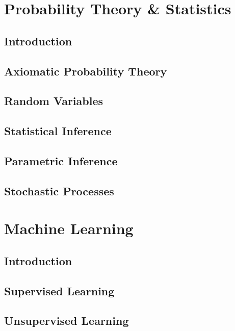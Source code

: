 \documentclass[a4paper, notitlepage]{report}
\begin{document}
\part{Probability Theory \& Statistics}

\chapter{Introduction}


\chapter{Axiomatic Probability Theory}


\chapter{Random Variables}


\chapter{Statistical Inference}


\chapter{Parametric Inference}


\chapter{Stochastic Processes}


\part{Machine Learning}

\chapter{Introduction}


\chapter{Supervised Learning}


\chapter{Unsupervised Learning}

\end{document}

